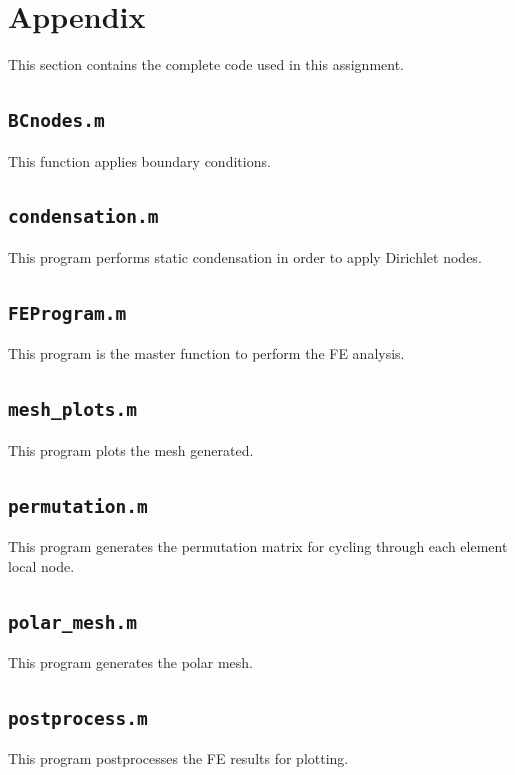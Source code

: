 \documentclass[10pt]{article}
\begin{document}
\section{Appendix}

This section contains the complete code used in this assignment. 

\subsection{\texttt{BCnodes.m}}
This function applies boundary conditions.


\subsection{\texttt{condensation.m}}
This program performs static condensation in order to apply Dirichlet nodes.


\subsection{\texttt{FEProgram.m}}
This program is the master function to perform the FE analysis.


\subsection{\texttt{mesh\_plots.m}}
This program plots the mesh generated.


\subsection{\texttt{permutation.m}}
This program generates the permutation matrix for cycling through each element local node.


\subsection{\texttt{polar\_mesh.m}}
This program generates the polar mesh.


\subsection{\texttt{postprocess.m}}
This program postprocesses the FE results for plotting.

\end{document}
